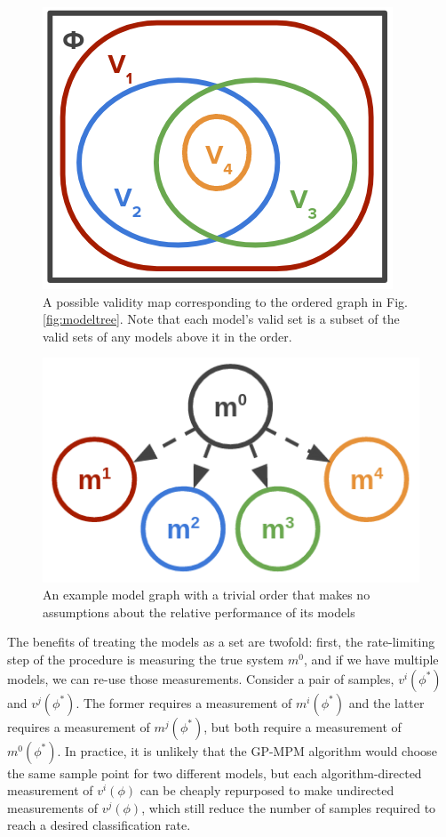 \documentclass[letterpaper, 10 pt, conference]{ieeeconf}  %
\begin{document}
\begin{figure}[htbp]
    \centerline{\includegraphics[width=0.9\columnwidth]{img/v_map.png}}
    \caption{A possible validity map corresponding to the ordered graph in Fig. \ref{fig:modeltree}. Note that each model's valid set is a subset of the valid sets of any models above it in the order.}
    \label{fig:vmap}
\end{figure}

\begin{figure}[htbp]
    \centerline{\includegraphics[width=0.9\columnwidth]{img/model_tree_unordered.png}}
    \caption{An example model graph with a trivial order that makes no assumptions about the relative performance of its models
    }
    \label{fig:modeltree2}
\end{figure}

The benefits of treating the models as a set are twofold: first, the rate-limiting step of the procedure is measuring the true system $m^0$, and if we have multiple models, we can re-use those measurements. Consider a pair of samples, $v^i(\phi^*)$ and $v^j(\phi^*)$. The former requires a measurement of $m^i(\phi^*)$ and the latter requires a measurement of $m^j(\phi^*)$, but both require a measurement of $m^0(\phi^*)$. In practice, it is unlikely that the GP-MPM algorithm would choose the same sample point for two different models, but each algorithm-directed measurement of $v^i(\phi)$ can be cheaply repurposed to make undirected measurements of $v^j(\phi)$, which still reduce the number of samples required to reach a desired classification rate.
\end{document}
